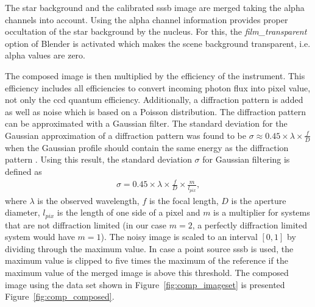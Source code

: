 The star background and the calibrated \gls{sssb} image are merged taking the alpha channels into account. Using the alpha channel information provides proper occultation of the star background by the nucleus. For this, the \textit{film\_transparent} option of Blender is activated which makes the scene background transparent, i.e. alpha values are zero.

The composed image is then multiplied by the efficiency of the instrument. This efficiency includes all efficiencies to convert incoming photon flux into pixel value, not only the \gls{ccd} quantum efficiency. Additionally, a diffraction pattern is added as well as noise which is based on a Poisson distribution. The diffraction pattern can be approximated with a Gaussian filter. The standard deviation for the Gaussian approximation of a diffraction pattern was found to be $\sigma \approx 0.45 \times \lambda \times \frac{f}{D}$ when the Gaussian profile should contain the same energy as the diffraction pattern \cite{Zhang2007GaussianModels}. Using this result, the standard deviation $\sigma$ for Gaussian filtering is defined as
\begin{align}
    \sigma = 0.45 \times \lambda \times \frac{f}{D} \times \frac{m}{l_{pix}}, \label{eq:comp_sigma}
\end{align}
where $\lambda$ is the observed wavelength, $f$ is the focal length, $D$ is the aperture diameter, $l_{pix}$ is the length of one side of a pixel and $m$ is a multiplier for systems that are not diffraction limited (in our case $m = 2$, a perfectly diffraction limited system would have $m = 1$). The noisy image is scaled to an interval $[0,1]$ by dividing through the maximum value. In case a point source \gls{sssb} is used, the maximum value is clipped to five times the maximum of the reference if the maximum value of the merged image is above this threshold. The composed image using the data set shown in Figure~\ref{fig:comp_imageset} is presented Figure~\ref{fig:comp_composed}.

